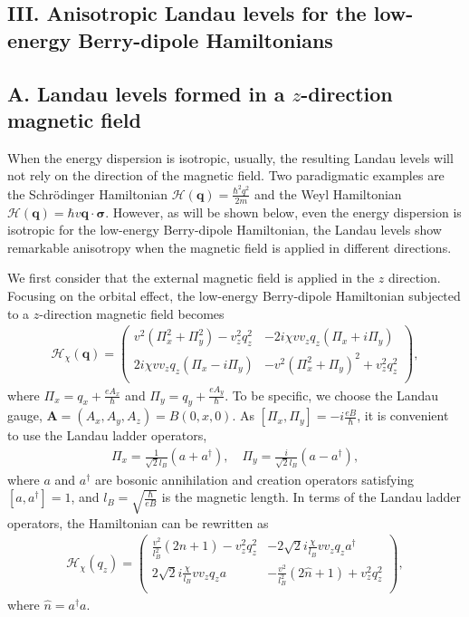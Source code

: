 \documentclass[aps,prl,twocolumn,longbibliography]{revtex4-1}
\newcommand{\bq}{\boldsymbol q}
\newcommand{\bA}{\boldsymbol{A}}
\begin{document}
\begin{widetext}
\section{III. Anisotropic Landau levels for the low-energy Berry-dipole Hamiltonians}

\subsection{A. Landau levels formed in a $z$-direction magnetic field}

When the energy dispersion is isotropic, usually, the resulting Landau levels will
not rely on the direction of the magnetic field. Two paradigmatic examples
are the Schr\"{o}dinger Hamiltonian $\mathcal{H}(\bq)=\frac{\hbar^{2}q^{2}}{2m}$ and
the Weyl Hamiltonian $\mathcal{H}(\bq)=\hbar v\bq\cdot\boldsymbol{\sigma}$. However,
as will be shown below, even the energy dispersion is isotropic for the low-energy
Berry-dipole Hamiltonian, the Landau levels show remarkable anisotropy when the
magnetic field is applied in different directions.

We first consider that the external magnetic field is applied in the $z$ direction. Focusing
on the orbital effect, the low-energy Berry-dipole Hamiltonian subjected to a $z$-direction magnetic field becomes
\begin{eqnarray}
\mathcal{H}_{\chi}(\bq)=\left(
                   \begin{array}{cc}
                     v^{2}(\Pi_{x}^{2}+\Pi_{y}^{2})-v_{z}^{2}q_{z}^{2} & -2i\chi v v_{z}q_{z}(\Pi_{x}+i\Pi_{y}) \\
                     2i\chi vv_{z}q_{z}(\Pi_{x}-i\Pi_{y}) & -v^{2}(\Pi_{x}^{2}+\Pi_{y})^{2}+v_{z}^{2}q_{z}^{2} \\
                   \end{array}
                 \right),
\end{eqnarray}
where $\Pi_{x}=q_{x}+\frac{eA_{x}}{\hbar}$ and $\Pi_{y}=q_{y}+\frac{eA_{y}}{\hbar}$. To be specific, we
choose the Landau gauge, $\bA=(A_{x},A_{y},A_{z})=B(0,x,0)$. As $[\Pi_{x},\Pi_{y}]=-i\frac{eB}{\hbar}$,
it is convenient to use the Landau ladder operators,
\begin{eqnarray}
\Pi_{x}=\frac{1}{\sqrt{2}l_{B}}(a+a^{\dag}), \quad \Pi_{y}=\frac{i}{\sqrt{2}l_{B}}(a-a^{\dag}),
\end{eqnarray}
where $a$ and $a^{\dag}$ are bosonic annihilation and creation operators satisfying $[a,a^{\dag}]=1$, and
$l_{B}=\sqrt{\frac{\hbar}{eB}}$ is the magnetic length. In terms of the Landau ladder operators, the
Hamiltonian can be rewritten as
\begin{eqnarray}
	\mathcal{H}_{\chi}(q_{z})=\left(\begin{array}{cc}
		\frac{v^{2}}{l_{B}^{2}}(2\hat{n}+1)-v_{z}^{2}q_{z}^{2} & -2\sqrt{2}i\frac{\chi}{l_{B}}vv_{z}q_{z}a^{\dag}\\
		2\sqrt{2}i\frac{\chi}{l_{B}}vv_{z}q_{z}a & -\frac{v^{2}}{l_{B}^{2}}(2\hat{n}+1)+v_{z}^{2}q_{z}^{2}\\
	\end{array}\right),
	\label{eq: Hlow_Bz}
\end{eqnarray}
where $\hat{n}=a^{\dag}a$.



\end{widetext}
\end{document}
